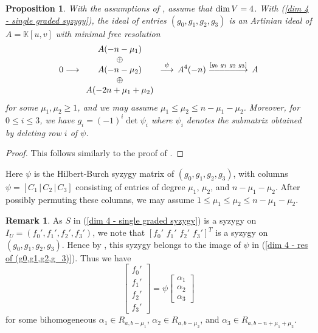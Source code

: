 \documentclass[reqno]{amsart}
\newtheorem{prop}[thm]{Proposition}
\numberwithin{equation}{section}
\theoremstyle{definition}
\newtheorem{rem}[thm]{Remark}
\def\K{\mathbb{K}}
\def\dim{\mathop{\rm dim}}
\DeclareRobustCommand{\longestrightarrow}{
\DOTSB\relbar\joinrel\relbar\joinrel\relbar\joinrel\relbar\joinrel\relbar\joinrel\relbar\joinrel\rightarrow
}
\begin{document}
 
 \begin{prop}\label{dim V = 4 - (g_0 g_1 g_2 g_3) Artinian so HB G2P}
 With the assumptions of , assume that $\dim V =4$. With (\ref{dim 4 - single graded syzygy}), the ideal of entries $(g_0, g_1, g_2,g_3)$ is an Artinian ideal of $A=\K[u,v]$ with minimal free resolution
\begin{equation}\label{dim 4 - res of (g0,g1,g2,g_3)}
 0 \longrightarrow \begin{array}{c}
 A(-n-\mu_1)\\
 \oplus \\
 A(-n-\mu_2)\\
 \oplus\\
A(-2n+\mu_1+\mu_2)
\end{array} \overset{\psi}{\longrightarrow} \,
A^4(-n)\overset{[g_0\,\,g_1\,\,g_2\,\,g_3]}{\longestrightarrow} \,
A
\end{equation}
for some $\mu_1,\mu_2 \geq 1$, and we may assume $\mu_1 \leq \mu_2\leq n-\mu_1-\mu_2$. Moreover, for $0\leq i\leq 3$, we have $g_i = (-1)^i\det \psi_i$ where $\psi_i$ denotes the submatrix obtained by deleting row $i$ of $\psi$.
\end{prop}

\begin{proof}
This follows similarly to the proof of .
\end{proof}


Here $\psi$ is the Hilbert-Burch syzygy matrix of $(g_0,g_1,g_2,g_3)$, with columns $\psi= [C_1\,|\, C_2\,|\,C_3]$ consisting of entries of degree $\mu_1$, $\mu_2$, and $n-\mu_1-\mu_2$. After possibly permuting these columns, we may assume $1\leq\mu_1 \leq \mu_2\leq n-\mu_1-\mu_2$.






\begin{rem}\label{dim 4 f' psi alpha}
As $S$ in (\ref{dim 4 - single graded syzygy}) is a syzygy on $I_U=(f_0',f_1',f_2',f_3')$, we note that $[f_0'\, \,f_1'\,\,f_2'\,\,f_3']^T$ is a syzygy on $(g_0,g_1,g_2,g_3)$. Hence by , this syzygy belongs to the image of $\psi$ in (\ref{dim 4 - res of (g0,g1,g2,g_3)}). Thus we have 
\begin{equation}\label{dim 4 - f alpha decomposition}
\left[\begin{array}{c}
     f_0'  \\
     f_1'\\
     f_2'\\
     f_3'
\end{array}\right] = \psi \left[\begin{array}{c}
    \alpha_1\\
    \alpha_2\\
    \alpha_3
\end{array}\right]
\end{equation}
for some bihomogeneous $\alpha_1 \in R_{a,b-\mu_1}$, $\alpha_2\in R_{a,b-\mu_2}$, and $\alpha_3\in R_{a,b-n+\mu_1+\mu_2}$.
\end{rem}
\end{document}
